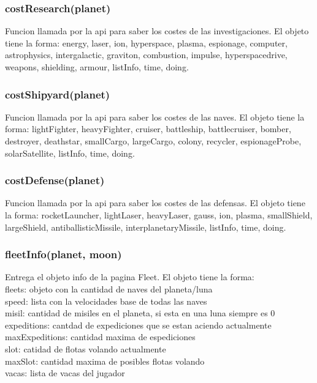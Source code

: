 \documentclass{article}
\newcommand\tab[1][1cm]{\hspace*{#1}}
\begin{document}
        \subsubsection{costResearch(planet)}
            Funcion llamada por la api para saber los costes de las investigaciones. El objeto tiene la forma: energy, laser, ion, hyperspace, plasma, espionage, computer, astrophysics, intergalactic, graviton, combustion, impulse, hyperspacedrive, weapons, shielding, armour, listInfo, time, doing.
        \subsubsection{costShipyard(planet)}
            Funcion llamada por la api para saber los costes de las naves. El objeto tiene la forma: lightFighter, heavyFighter, cruiser, battleship, battlecruiser, bomber, destroyer, deathstar, smallCargo, largeCargo, colony, recycler, espionageProbe, solarSatellite, listInfo, time, doing.
        \subsubsection{costDefense(planet)}
            Funcion llamada por la api para saber los costes de las defensas. El objeto tiene la forma: rocketLauncher, lightLaser, heavyLaser, gauss, ion, plasma, smallShield, largeShield, antiballisticMissile, interplanetaryMissile, listInfo, time, doing.
        \subsubsection{fleetInfo(planet, moon)}
            Entrega el objeto info de la pagina Fleet. El objeto tiene la forma:\\
            \tab fleets: objeto con la cantidad de naves del planeta/luna\\
            \tab speed: lista con la velocidades base de todas las naves\\
            \tab misil: cantidad de misiles en el planeta, si esta en una luna siempre es 0\\
            \tab expeditions: cantdad de expediciones que se estan aciendo actualmente\\
            \tab maxExpeditions: cantidad maxima de espediciones\\
            \tab slot: catidad de flotas volando actualmente\\
            \tab maxSlot: cantidad maxima de posibles flotas volando\\
            \tab vacas: lista de vacas del jugador\\
\end{document}
